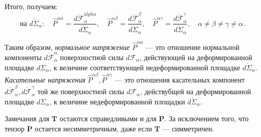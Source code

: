 Итого, получаем:
\begin{equation*}
	\text{на } d\mathring{\Sigma}_{\alpha} : \quad \widehat{P}^{\alpha\alpha} = \frac{d\mathring{\mathcal{F}}^{alpha}_{\alpha}}{d\mathring{\Sigma}_{\alpha}}, \quad \widehat{P}^{\alpha \beta} = \frac{d \mathring{\mathcal{F}}^{\beta}_{\alpha}}{d\mathring{\Sigma}_{\alpha}}, \quad \widehat{P}^{\alpha \gamma} = \frac{d \mathring{\mathcal{F}}^{\gamma}_{\alpha}}{d\mathring{\Sigma}_{\alpha}}, \quad \alpha \not = \beta \not = \gamma \not = \alpha.
\end{equation*}

Таким образом, \textit{нормальное напряжение} $\widehat{P}^{\alpha \alpha}$ --- это отношение нормальной компоненты $d\mathring{\mathcal{F}}^{\alpha}_{\alpha}$ поверхностной силы $d\mathcal{F}_{\alpha}$, действующей на деформированной площадке $d\Sigma_{\alpha}$, к величине соответствующей недеформированной площадке $d\mathring{\Sigma}_{\alpha}$. \textit{Касательные напряжения} $\widehat{P}^{\alpha\beta}, \widehat{P}^{\alpha\gamma}$ --- это отношения касательных компонент $d\mathring{\mathcal{F}}^{\beta}_{\alpha}, d\mathring{\mathcal{F}}^{\gamma}_{\alpha}$ той же поверхностной силы $d\mathcal{F}_{\alpha}$, действубщей на деформированной площадке $d\Sigma_{\alpha}$, к величине недеформированной площадки $d\mathring{\Sigma}_{\alpha}$.

Замечания для $\mathbf{T}$ остаются справедливыми и для $\mathbf{P}$. За исключением того, что тензор $\mathbf{P}$ остается несимметричным, даже если $\mathbf{T}$ --- симметричен. 